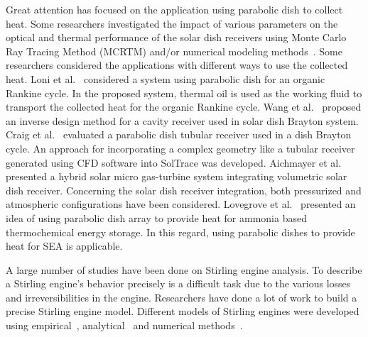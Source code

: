Great attention has focused on the application using parabolic dish to collect heat. Some researchers investigated the impact of various parameters on the optical and thermal performance of the solar dish receivers using Monte Carlo Ray Tracing Method (MCRTM) and/or numerical modeling methods~\cite{Cheng2013,Mao2014,Wang2010,Wang2013,Zhu2015,Sha2016,Daabo2016}. Some researchers considered the applications with different ways to use the collected heat. Loni et al.~\cite{Loni2016} considered a system using parabolic dish for an organic Rankine cycle. In the proposed system, thermal oil is used as the working fluid to transport the collected heat for the organic Rankine cycle. Wang et al.~\cite{Wang2014} proposed an inverse design method for a cavity receiver used in solar dish Brayton system. Craig et al.~\cite{Craig2016} evaluated a parabolic dish tubular receiver used in a dish Brayton cycle. An approach for incorporating a complex geometry like a tubular receiver generated using CFD software into SolTrace was developed. Aichmayer et al.~\cite{Aichmayer2015} presented a hybrid solar micro gas-turbine system integrating volumetric solar dish receiver. Concerning the solar dish receiver integration, both pressurized and atmospheric configurations have been considered. Lovegrove et al.~\cite{Lovegrove2004} presented an idea of using parabolic dish array to provide heat for ammonia based thermochemical energy storage. In this regard, using parabolic dishes to provide heat for SEA is applicable.

A large number of studies have been done on Stirling engine analysis. To describe a Stirling engine's behavior precisely is a difficult task due to the various losses and irreversibilities in the engine.
Researchers have done a lot of work to build a precise Stirling engine model. Different models of Stirling engines were developed using empirical~\cite{Senft1998,Costea1999,Prieto2003,Organ2013,Kongtragool2005,Thombare2008}, analytical~\cite{Ohtomo1995,Rogdakis2004,Kongtragool2006,Puech2011,Formosa2010,Shazly2014,Cullen2011,Ahmadi2013,Ahmadi2013b,Tursunbaev2007} and numerical methods~\cite{Urieli1984,Ni2016,Jia2016,Strauss2010,Abbas2014,Araoz2015,Babaelahi2015,Barreto2017,Wu1998,Li2011,Hosseinzade2015}.

